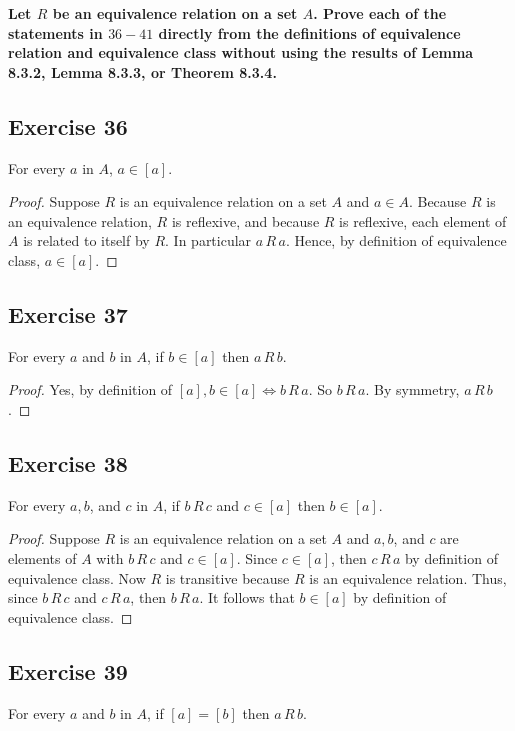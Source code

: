 \documentclass[14pt]{extarticle}
\newcommand{\cy}{\color{cyan}}
\begin{document}
{\bf \cy Let $R$ be an equivalence relation on a set $A$. Prove each of the statements in $36-41$ directly from the 
definitions of equivalence relation and equivalence class without using the results of Lemma 8.3.2, Lemma 8.3.3, or 
Theorem 8.3.4.}

\subsection{Exercise 36}
For every $a$ in $A$, \(a \in [a]\).

\begin{proof}
Suppose $R$ is an equivalence relation on a set $A$ and \(a \in A\). Because $R$ is an equivalence relation, $R$ is 
reflexive, and because $R$ is reflexive, each element of $A$ is related to itself by $R$. In particular \(a\,R\,a\). 
Hence, by definition of equivalence class, \(a \in [a]\).
\end{proof}

\subsection{Exercise 37}
For every $a$ and $b$ in $A$, if \(b \in [a]\) then \(a \,R\, b\).

\begin{proof}
Yes, by definition of \([a], b \in [a] \iff b \,R\,a\). So \(b \,R\, a\). By symmetry, \(a \,R\, b\).
\end{proof}

\subsection{Exercise 38}
For every \(a, b\), and \(c\) in \(A\), if \(b \,R\, c\) and \(c \in [a]\) then \(b \in [a]\).

\begin{proof}
Suppose $R$ is an equivalence relation on a set $A$ and \(a, b\), and $c$ are elements of $A$ with \(b \,R\, c\) and 
\(c \in [a]\). Since \(c \in [a]\), then \(c \,R\, a\) by definition of equivalence class. Now \(R\) is transitive 
because \(R\) is an equivalence relation. Thus, since \(b \,R\, c\) and \(c \,R\, a\), then \(b \,R\, a\). It follows 
that \(b \in [a]\) by definition of equivalence class.
\end{proof}

\subsection{Exercise 39}
For every $a$ and $b$ in $A$, if \([a] = [b]\) then \(a \,R\, b\).
\end{document}
